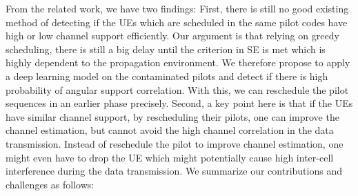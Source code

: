 From the related work, we have two findings: First, there is still no good existing method of detecting if the UEs which are scheduled in the same pilot codes have high or low channel support efficiently. Our argument is that relying on greedy scheduling, there is still a big delay until the criterion in SE is met which is highly dependent to the propagation environment. 
We therefore propose to apply a deep learning model on the contaminated pilots and detect if there is high probability of angular support correlation. With this, we can reschedule the pilot sequences in an earlier phase precisely. Second, a key point here is that if the UEs have similar channel support, by rescheduling their pilots, one can improve the channel estimation, but cannot avoid the high channel correlation in the data transmission. Instead of reschedule the pilot to improve channel estimation, one might even have to drop the UE which might potentially cause high inter-cell interference during the data transmission.  %
We summarize our contributions and challenges as follows:
